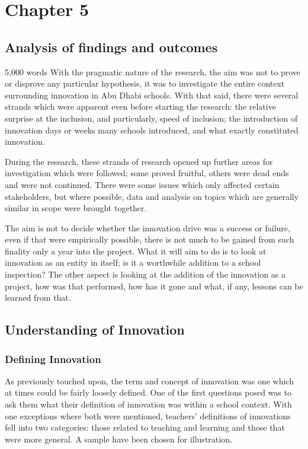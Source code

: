 \section{Chapter 5}
\subsection{Analysis of findings and outcomes}
5,000 words
With the pragmatic nature of the research, the aim was not to prove or disprove any particular hypothesis, it was to investigate the entire context surrounding innovation in Abu Dhabi schools. With that said, there were several strands which were apparent even before starting the research: the relative surprise at the inclusion, and particularly, speed of inclusion; the introduction of innovation days or weeks many schools introduced, and what exactly constituted innovation.

During the research, these strands of research opened up further areas for investigation which were followed; some proved fruitful, others were dead ends and were not continued. There were some issues which only affected certain stakeholders, but where possible, data and analysis on topics which are generally similar in scope were brought together.

The aim is not to decide whether the innovation drive was a success or failure, even if that were empirically possible, there is not much to be gained from such finality only a year into the project. What it will aim to do is to look at innovation as an entity in itself; is it a worthwhile addition to a school inspection? The other aspect is looking at the addition of the innovation as a project, how was that performed, how has it gone and what, if any, lessons can be learned from that.

\subsection{Understanding of Innovation}
\subsubsection{Defining Innovation}
As previously touched upon, the term and concept of innovation was one which at times could be fairly loosely defined. One of the first questions posed was to ask them what their definition of innovation was within a school context. With one exceptions where both were mentioned, teachers' definitions of innovations fell into two categories: those related to teaching and learning and those that were more general. A sample have been chosen for illustration.

